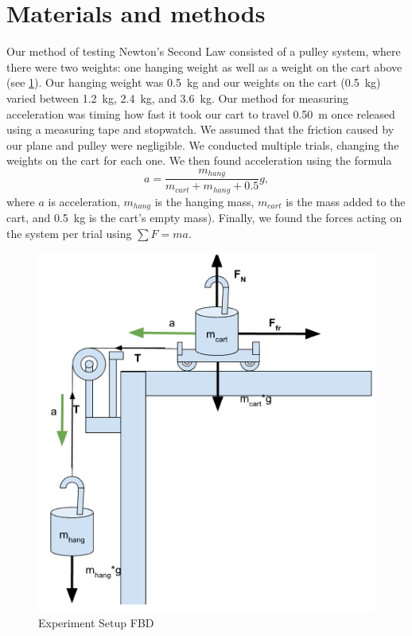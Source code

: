 ﻿\documentclass[reprint,amsmath,amssymb,aps,twoside]{revtex4-2}
\begin{document}
\section{Materials and methods}
Our method of testing Newton’s Second Law consisted of a pulley system, where there were two weights: one hanging weight as well as a weight on the cart above (see \cref{fig:1}). Our hanging weight was \qty{0.5}{\kilo\gram} and our weights on the cart (\qty{0.5}{\kilo\gram}) varied between \qty{1.2}{\kilo\gram}, \qty{2.4}{\kilo\gram}, and \qty{3.6}{\kilo\gram}. Our method for measuring acceleration was timing how fast it took our cart to travel \qty{0.50}{\meter} once released using a measuring tape and stopwatch. We assumed that the friction caused by our plane and pulley were negligible. We conducted multiple trials, changing the weights on the cart for each one. We then found acceleration using the formula
\begin{equation}
a = \dfrac{m_{hang}}{m_{cart}+m_{hang}+0.5} g,
\label{eq:apred}
\end{equation}
where $a$ is acceleration, $m_{hang}$ is the hanging mass, $m_{cart}$ is the mass added to the cart, and \qty{0.5}{\kilo\gram} is the cart's empty mass). Finally, we found the forces acting on the system per trial using $\sum F = ma$.

\begin{figure}
\begin{center}
\includegraphics[width=0.66\columnwidth]{fig1.png}
\end{center}
\caption{Experiment Setup FBD}
\label{fig:1}
\end{figure}
\end{document}
